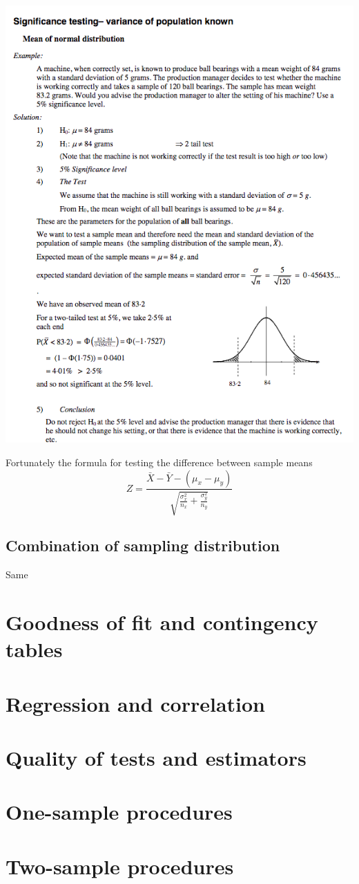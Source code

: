 \documentclass[a4paper]{article}
\begin{document}
\begin{eg}
\end{eg}

\begin{center}
	\includegraphics[scale=0.5]{img_S/18_eg2}
\end{center}

Fortunately the formula for testing the difference between sample means 
\[
	Z=\frac{\bar{X}-\bar{Y}-(\mu_x-\mu_y)}{\sqrt{\frac{\sigma_x^2}{n_x}+{\frac{\sigma_y^2}{n_y}}}}
\]

\subsection{Combination of sampling distribution}
Same

\section{Goodness of fit and contingency tables}

\section{Regression and correlation}

\section{Quality of tests and estimators}

\section{One-sample procedures}

\section{Two-sample procedures}

\printindex
\end{document}
